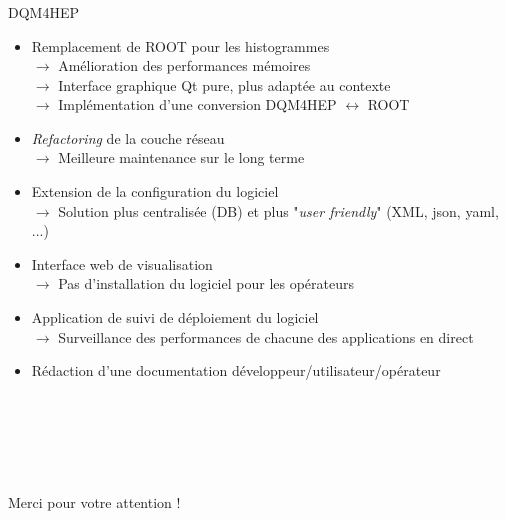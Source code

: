 \documentclass[8pt]{beamer}
\begin{document}
  \begin{frame}
  \frametitle{\secname}
  \framesubtitle{\subsecname}
    \begin{block}{DQM4HEP}
      \begin{itemize}
        \pause
        \item Remplacement de ROOT pour les histogrammes \\
        $\rightarrow$ Amélioration des performances mémoires \\
        $\rightarrow$ Interface graphique Qt pure, plus adaptée au contexte \\
        $\rightarrow$ Implémentation d'une conversion DQM4HEP $\leftrightarrow$ ROOT
        \pause
        \item \textit{Refactoring} de la couche réseau \\
        $\rightarrow$ Meilleure maintenance sur le long terme
        \pause
        \item Extension de la configuration du logiciel \\
        $\rightarrow$ Solution plus centralisée (DB) et plus "\textit{user friendly}" (XML, json, yaml, ...)
        \pause
        \item Interface web de visualisation \\
        $\rightarrow$ Pas d'installation du logiciel pour les opérateurs
        \pause
        \item Application de suivi de déploiement du logiciel \\
        $\rightarrow$ Surveillance des performances de chacune des applications en direct
        \pause
        \item Rédaction d'une documentation développeur/utilisateur/opérateur
      \end{itemize}
    \end{block}
  \end{frame}

  \begin{frame}
    \begin{center}
      ~ \\
      ~ \\
      ~ \\
      ~ \\
      ~ \\
      \Large Merci pour votre attention !
    \end{center}
  \end{frame}
\end{document}
